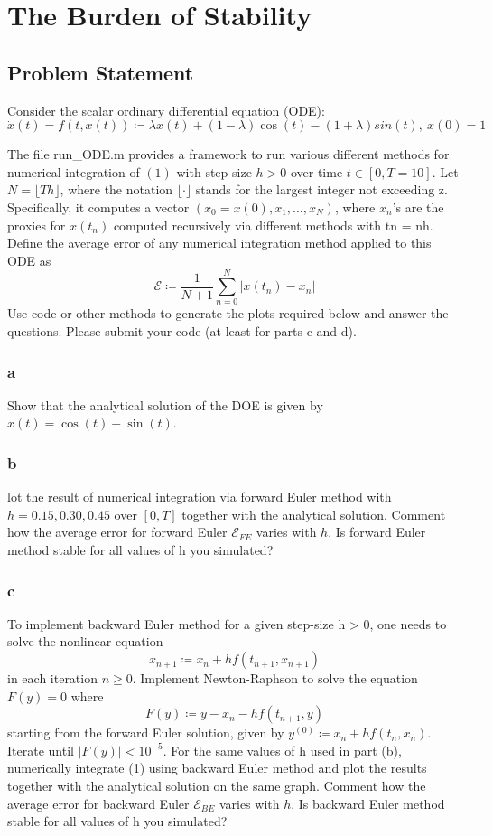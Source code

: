 \documentclass[11pt]{report}
\theoremstyle{definition}
\begin{document}
\section*{The Burden of Stability}
\subsection*{Problem Statement}
Consider the scalar ordinary differential equation (ODE):
\begin{equation}
	\dot{x}(t) = f(t, x(t)) \coloneqq \lambda x(t)+(1-\lambda)\cos(t)-(1+\lambda)sin(t),\ x(0)=1
\end{equation}


The file run\_ODE.m provides a framework to run various different methods for
numerical integration of $(1)$ with step-size $h > 0$ over time $t\in[0,T=10]$.
Let $N=\lfloor Th\rfloor$, where the notation $\lfloor\cdot\rfloor$ stands for
the largest integer not exceeding z. Specifically, it computes a vector $(x_0 =
	x(0), x_1, \ldots, x_N )$, where $x_n$’s are the proxies for $x(t_n)$ computed
recursively via different methods with tn = nh. Define the average error of any
numerical integration method applied to this ODE as
\[ \mathcal{E}\coloneqq \frac{1}{N+1}\sum_{n=0}^{N}|x(t_n)-x_n| \]
Use code or other methods to generate the plots required below and answer the questions.
Please submit your code (at least for parts c and d).

\subsubsection*{a}
Show that the analytical solution of the DOE is given by $x(t)=\cos(t)+\sin(t)$.

\subsubsection*{b}
lot the result of numerical integration via forward Euler method with
$h=0.15,0.30,0.45$ over $[0,T]$ together with the analytical solution. Comment
how the average error for forward Euler $\mathcal{E}_{FE}$ varies with $h$.  Is
forward Euler method stable for all values of h you simulated?

\subsubsection*{c}
To implement backward Euler method for a given step-size h > 0, one needs to solve the nonlinear
equation
\[x_{n+1} \coloneqq x_n + hf(t_{n+1}, x_{n+1})\]
in each iteration $n\geq 0$. Implement Newton-Raphson to solve the equation $F(y)=0$ where
\[F(y)\coloneqq y-x_n-hf(t_{n+1},y)\]
starting from the forward Euler solution, given by $y^{(0)}\coloneqq x_n +
	hf(t_n,x_n)$.  Iterate until $|F(y)|<10^{-5}$.  For the same values of h used in
part (b), numerically integrate (1) using backward Euler method and plot the
results together with the analytical solution on the same graph. Comment how the
average error for backward Euler $\mathcal{E}_{BE}$ varies with $h$. Is backward
Euler method stable for all values of h you simulated?
\end{document}
